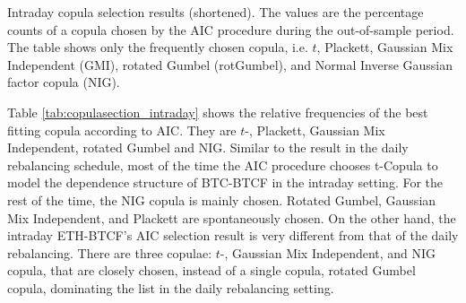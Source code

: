 \documentclass[11pt,a4paper,english]{article}
\begin{document}
\begin{table}[t]

 \caption{Intraday copula selection results (shortened).
        The values are the percentage counts of a copula chosen by the AIC procedure during the out-of-sample period.
        The table shows only the frequently chosen copula, i.e. $t$, Plackett, Gaussian Mix Independent (GMI), rotated Gumbel (rotGumbel), and
        Normal Inverse Gaussian factor copula (NIG).
        }
    \label{tab:copulasection_intraday}
\end{table}

Table \ref{tab:copulasection_intraday} shows the relative frequencies
of the best fitting copula according to AIC.
They are $t$-, Plackett, Gaussian Mix Independent, rotated Gumbel and NIG.
Similar to the result in the daily rebalancing schedule, most of the time the AIC procedure chooses t-Copula to model
the dependence structure of BTC-BTCF in the intraday setting.
For the rest of the time, the NIG copula is mainly chosen.
Rotated Gumbel, Gaussian Mix Independent, and Plackett are spontaneously chosen.
On the other hand, the intraday ETH-BTCF’s AIC selection result is very different from that of the daily rebalancing.
There are three copulae: $t$-, Gaussian Mix Independent, and NIG copula, that are closely chosen, instead of a single copula, rotated Gumbel copula, dominating the list in the daily rebalancing setting.
\end{document}
